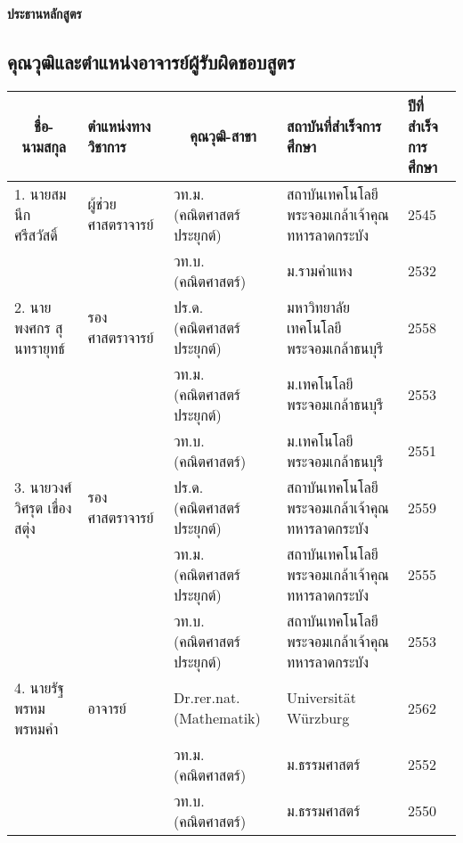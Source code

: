 \par\dag{} \textbf{ประธานหลักสูตร} 

\subsection*{คุณวุฒิและตำแหน่งอาจารย์ผู้รับผิดชอบสูตร}


{\small
\begin{longtable}{|p{}|p{}|p{}|p{}|p{}|}
\hline
\multicolumn{1}{|c|}{\textbf{ชื่อ-นามสกุล}} & \textbf{ตำแหน่งทางวิชาการ} & \multicolumn{1}{|c|}{\textbf{คุณวุฒิ-สาขา}}               & \textbf{สถาบันที่สำเร็จการศึกษา}               & \textbf{ปีที่สำเร็จการศึกษา} \\ \hline

\endhead

\multirow{1}{*}{1. นายสมนึก ศรีสวัสดิ์}  & ผู้ช่วยศาสตราจารย์ & วท.ม. (คณิตศาสตร์ประยุกต์) & สถาบันเทคโนโลยีพระจอมเกล้าเจ้าคุณทหารลาดกระบัง & 2545 \\ \cline{3-5} 
             &                   & วท.บ. (คณิตศาสตร์)         & ม.รามคำแหง                   & 2532                \\ \hline
                          
\multirow{1}{*}{2. นายพงศกร สุนทรายุทธ์} &รองศาสตราจารย์    & ปร.ด. (คณิตศาสตร์ประยุกต์) & มหาวิทยาลัยเทคโนโลยีพระจอมเกล้าธนบุรี          & 2558 \\ \cline{3-5} 
             &                   & วท.ม. (คณิตศาสตร์ประยุกต์) & ม.เทคโนโลยีพระจอมเกล้าธนบุรี & 2553                \\ \cline{3-5} 
             &                   & วท.บ. (คณิตศาสตร์)         & ม.เทคโนโลยีพระจอมเกล้าธนบุรี & 2551                \\ \hline
             
\multirow{1}{*}{3. นายวงศ์วิศรุต เขื่องสตุ่ง} &รองศาสตราจารย์     & ปร.ด. (คณิตศาสตร์ประยุกต์) & สถาบันเทคโนโลยีพระจอมเกล้าเจ้าคุณทหารลาดกระบัง          & 2559 \\ \cline{3-5} 
             &                   & วท.ม. (คณิตศาสตร์ประยุกต์) & สถาบันเทคโนโลยีพระจอมเกล้าเจ้าคุณทหารลาดกระบัง & 2555                \\ \cline{3-5} 
             &                   & วท.บ. (คณิตศาสตร์ประยุกต์)         & สถาบันเทคโนโลยีพระจอมเกล้าเจ้าคุณทหารลาดกระบัง & 2553                \\ \hline
             
             
\multirow{1}{*}{4. นายรัฐพรหม พรหมคำ} & อาจารย์    & Dr.rer.nat. (Mathematik) & Universität Würzburg          & 2562 \\ \cline{3-5} 
             &                   & วท.ม. (คณิตศาสตร์) & ม.ธรรมศาสตร์ & 2552                \\ \cline{3-5} 
             &                   & วท.บ. (คณิตศาสตร์)         & ม.ธรรมศาสตร์ & 2550                \\ \hline
 

\end{longtable}}
